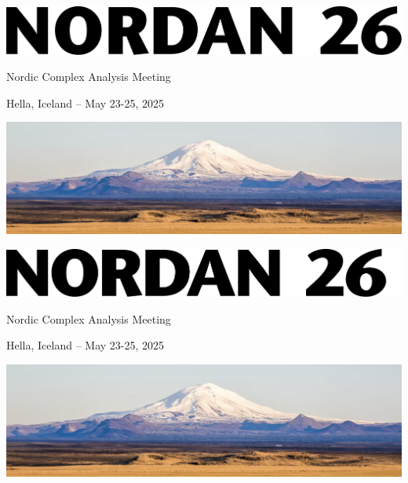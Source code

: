 \documentclass[12pt,openany]{report}      %
\def\SUBTITLE{Nordic Complex Analysis Meeting}
\def\LOCATION{Hella, Iceland -- May 23-25, 2025}
\begin{document}
\begin{titlepage}
	\centering
                        \includegraphics[scale = 0.45]{figs/title2} \\
	\vspace{0.5cm}
	{\Huge \textsf{\SUBTITLE}\par}
	\vspace{0.5cm}
	{\Large \LOCATION\par}
	\vspace{2cm}
	\vfill
    \includegraphics[width=1\textwidth]{figs/cover}\par\vspace{1cm}
\end{titlepage}
\begin{titlepage}
	\centering
                        \includegraphics[scale = 0.45]{figs/title3} \\
	\vspace{0.5cm}
	{\Huge \textsf{\SUBTITLE}\par}
	\vspace{0.5cm}
	{\Large \LOCATION\par}
	\vspace{2cm}
	\vfill
    \includegraphics[width=1\textwidth]{figs/cover}\par\vspace{1cm}
\end{titlepage}
\end{document}
